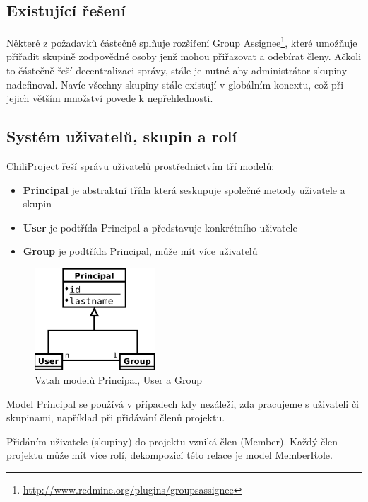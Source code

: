 \documentclass[thesis=B,czech]{FITthesis}[2012/05/02]
\begin{document}
\subsection{Existující řešení}

Některé z požadavků částečně splňuje rozšíření Group Assignee\footnote{\url{http://www.redmine.org/plugins/groupsassignee}},
které umožňuje přiřadit skupině zodpovědné osoby jenž mohou přiřazovat a
odebírat členy. Ačkoli to částečně řeší decentralizaci správy, stále je
nutné aby administrátor skupiny nadefinoval. Navíc všechny skupiny stále
existují v globálním konextu, což při jejich větším množství povede k
nepřehlednosti.

\subsection{Systém uživatelů, skupin a rolí}

\label{sec:proj_group_sys}

ChiliProject řeší správu uživatelů prostřednictvím tří modelů:

\begin{itemize}
\item
  \textbf{Principal} je abstraktní třída která seskupuje společné metody
  uživatele a skupin
\item
  \textbf{User} je podtřída Principal a představuje konkrétního
  uživatele
\item
  \textbf{Group} je podtřída Principal, může mít více uživatelů
\end{itemize}
\begin{figure}[htbp]
\centering
\includegraphics[width=0.4\textwidth]{group-er1.pdf}
\caption{Vztah modelů Principal, User a Group}
\end{figure}

Model Principal se používá v případech kdy nezáleží, zda pracujeme s
uživateli či skupinami, například při přidávání členů projektu.

Přidáním uživatele (skupiny) do projektu vzniká člen (Member). Každý
člen projektu může mít více rolí, dekompozicí této relace je model
MemberRole.
\end{document}
